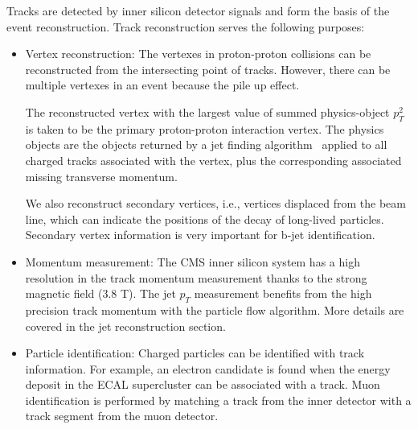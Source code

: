 Tracks are detected by inner silicon detector signals and form the basis of the event reconstruction. Track reconstruction serves the following purposes: 
\begin{itemize}
\item Vertex reconstruction: The vertexes in proton-proton collisions can be reconstructed from the intersecting point of tracks. However, there can be multiple vertexes in an event because the pile up effect. 

The reconstructed vertex with the largest value of summed physics-object $p_{T}^2$ is taken to be the primary proton-proton interaction vertex. The physics objects are the objects returned by a jet finding algorithm~\cite{Cacciari:2008gp,Cacciari:2011ma} applied to all charged tracks associated with the vertex, plus the corresponding associated missing transverse momentum.

We also reconstruct secondary vertices, i.e., vertices displaced from the beam line, which can indicate the positions of the decay of long-lived particles. Secondary vertex information is very important for b-jet identification.
\item Momentum measurement: The CMS inner silicon system has a high resolution in the track momentum measurement thanks to the strong magnetic field (3.8 T). The jet $p_{T}$ measurement benefits from the high precision track momentum with the particle flow algorithm. More details are covered in the jet reconstruction section.
\item Particle identification: Charged particles can be identified with track information. For example, an electron candidate is found when the energy deposit in the ECAL supercluster can be associated with a track. Muon identification is performed by matching a track from the inner detector with a track segment from the muon detector.
\end{itemize}


